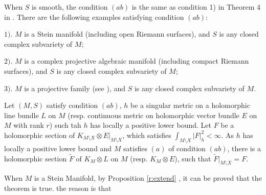   When $S$ is smooth, the condition $(ab)$ is the same as condition 1)
  in Theorem 4 in \cite{ohsawa5}. There are the following examples
  satisfying condition $(ab)$:
  
  $1).$ $M$ is a Stein manifold (including open Riemann surfaces),
  and $S$ is any closed complex subvariety of $M$;
  
  $2).$ $M$ is a complex projective algebraic manifold (including
  compact Riemann surfaces), and $S$ is any closed complex subvariety
  of $M$;
  
  $3).$ $M$ is a projective family (see \cite{siu00}),
  and $S$ is any closed complex subvariety of $M$.

\begin{prop}\label{r:extend} 
  Let $(M,S)$ satisfy condition $(ab)$, $h$ be a
  singular metric on a holomorphic line bundle $L$ on $M$ (resp.
  continuous metric on holomorphic vector bundle $E$ on $M$ with rank
  $r$) such tah $h$ has locally a positive lower bound. Let $F$ be a
  holomorphic section of $K_{M\setminus X}\otimes E|_{M\setminus X}$,
  which satisfies $\int_{M\setminus X}|F|^{2}_{h}<\infty$. As $h$ has
  locally a positive lower bound and \textcolor{purple4}{$M$ satisfies $(a)$ of condition
  $(ab)$, there is a holomorphic section $\widetilde{F}$ of $K_{M}\otimes
  L$ on $M$ (resp. $K_{M}\otimes E$), such that
  $\widetilde{F}|_{M\setminus X}=F$.}
  \end{prop}

When $M$ is a Stein Manifold, by Proposition \ref{r:extend} , it can be proved that the theorem is true. the reason is that 

